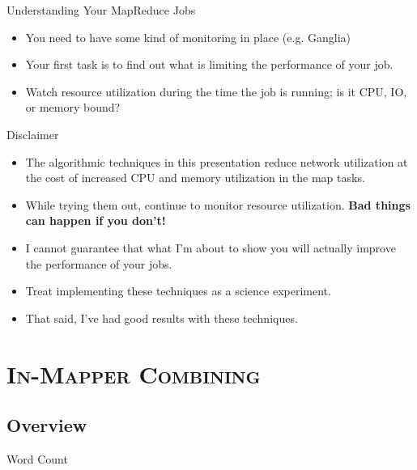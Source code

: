 \documentclass[xcolor=x11names,compress]{beamer}
\renewcommand{\(}{\begin{columns}}
\renewcommand{\)}{\end{columns}}
\newcommand{\<}[1]{\begin{column}{#1}}
\renewcommand{\>}{\end{column}}
\begin{document}
\begin{frame}{Understanding Your MapReduce Jobs}
  \begin{itemize}
  \item<1,2> You need to have some kind of monitoring in place (e.g. Ganglia)
  \item<2,3> Your first task is to find out what is limiting the
    performance of your job.
  \item<3> Watch resource utilization during the time the job is
    running; is it CPU, IO, or memory bound?
  \end{itemize}
\end{frame}

\begin{frame}{Disclaimer}
  \begin{itemize}
  \item<1,2> The algorithmic techniques in this presentation reduce network
    utilization at the cost of increased CPU and memory utilization in
    the map tasks.
  \item<2> While trying them out, continue to monitor resource
    utilization. \bf{Bad things can happen if you don't!}
  \item<3,4> I cannot guarantee that what I'm about to show you will
    actually improve the performance of your jobs.
  \item<4> Treat implementing these techniques as a science experiment.
  \item<5> That said, I've had good results with these techniques.
  \end{itemize}
\end{frame}

\section{\scshape In-Mapper Combining}

\subsection{Overview}
\begin{frame}{Word Count}
  \begin{algorithm}[H]
  \end{algorithm}
\end{frame}
\end{document}
